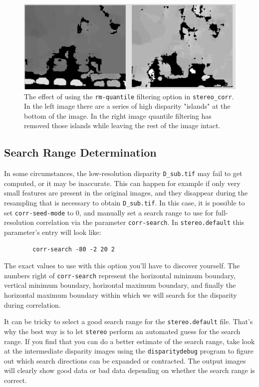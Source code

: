 \begin{figure}[tb]
  \centering
  \includegraphics[width=17cm]{images/correlation/quantile_filter_result.png}
  \caption{The effect of using the \texttt{rm-quantile} filtering option
  in \texttt{stereo\_corr}. In the left image there are a series of high
  disparity "islands" at the bottom of the image.  In the right image quantile
  filtering has removed those islands while leaving the rest of the image intact.}
  \label{fig:quantile-filtering-effect}
\end{figure}


\subsection{Search Range Determination}
\label{sec:search_range}

In some circumstances, the low-resolution
disparity \texttt{D\_sub.tif} may fail to get computed, or it may be
inaccurate. This can happen for example if only very small features are
present in the original images, and they disappear during the resampling
that is necessary to obtain \texttt{D\_sub.tif}. In this case, it is
possible to set \texttt{corr-seed-mode} to 0, and manually set a search
range to use for full-resolution correlation via the parameter
\texttt{corr-search}. In \texttt{stereo.default} this parameter's entry
will look like:

\begin{verbatim}
        corr-search -80 -2 20 2
\end{verbatim}

The exact values to use with this option you'll have to discover
yourself. The numbers right of \texttt{corr-search} represent the
horizontal minimum boundary, vertical minimum boundary, horizontal
maximum boundary, and finally the horizontal maximum boundary within
which we will search for the disparity during correlation.

It can be tricky to select a good search range for the \texttt{stereo.default} file.
That's why the best way is to let \texttt{stereo} perform an automated
guess for the search range. If you find that you can do a
better estimate of the search range, take look at the intermediate
disparity images using the \texttt{disparitydebug} program to figure
out which search directions can be expanded or contracted. The output
images will clearly show good data or bad data depending on whether
the search range is correct.

